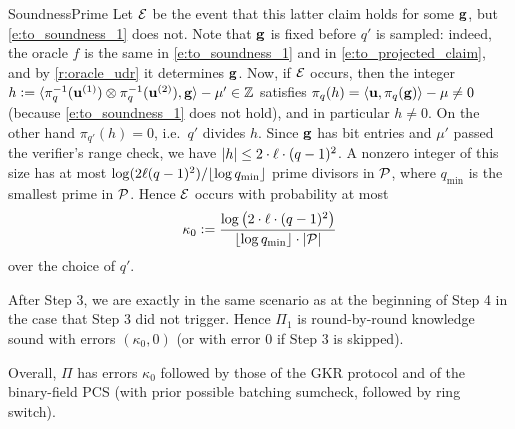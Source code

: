 \begin{lncsmove}{SoundnessPrime}
Let $\mathcal{E}$ be the event that this latter claim holds for some $\mathbf{g}$, but \eqref{e:to_soundness_1} does not. Note that $\mathbf{g}$ is fixed before $q'$ is sampled: indeed, the oracle $f$ is the same in \eqref{e:to_soundness_1} and in \eqref{e:to_projected_claim}, and by \cref{r:oracle_udr} it determines $\mathbf{g}$. Now, if $\mathcal{E}$ occurs, then the integer $h{\;\vcentcolon=\;} \langle \pi_q^{-1}(\mathbf{u}^{(1)})\otimes \pi_q^{-1}(\mathbf{u}^{(2)}), \mathbf{g}\rangle - \mu' \in \mathbb{Z}$ satisfies $\pi_q(h)=\langle \mathbf{u}, \pi_q(\mathbf{g})\rangle-\mu\neq 0$ (because \eqref{e:to_soundness_1} does not hold), and in particular $h\neq 0$. On the other hand $\pi_{q'}(h)=0$, i.e.\ $q'$ divides $h$. Since $\mathbf{g}$ has bit entries and $\mu'$ passed the verifier's range check, we have $|h|\leq 2\cdot \ell\cdot (q-1)^2$. A nonzero integer of this size has at most $\log(2\ell(q-1)^2)/\lfloor\log q_{\min}\rfloor$ prime divisors in $\mathcal{P}$, where $q_{\min}$ is the smallest prime in $\mathcal{P}$. Hence $\mathcal{E}$ occurs with probability at most 
% 
\begin{equation}\label{e:to_kappa_0}
\kappa_0 {\;\vcentcolon=\;} \frac{\log\left(2\cdot \ell\cdot (q-1)^2\right)}{\lfloor\log q_{\min}\rfloor\cdot |\mathcal{P}|}
\end{equation}
%
over the choice of $q'$. 


After Step 3, we are exactly in the same scenario as at the beginning of Step 4 in the case that Step 3 did not trigger. Hence $\Pi_1$ is round-by-round knowledge sound with errors $(\kappa_0, 0)$ (or with error $0$ if Step 3 is skipped). 

Overall,  $\Pi$ has errors $\kappa_0$ followed by those of the GKR protocol and of the binary-field PCS (with prior possible batching sumcheck, followed by  ring switch).



\end{lncsmove}
